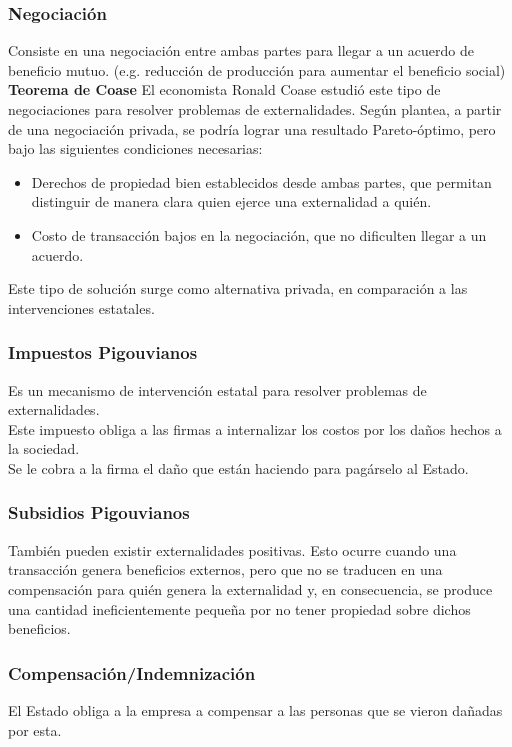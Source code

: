 \subsubsection{Negociación}
Consiste en una negociación entre ambas partes para llegar a un acuerdo de beneficio mutuo. (e.g. reducción de producción para aumentar el beneficio social)\\


\textbf{Teorema de Coase}
El economista Ronald Coase estudió este tipo de negociaciones para resolver problemas de externalidades. Según plantea, a partir de una negociación privada, se podría lograr una resultado Pareto-óptimo, pero bajo las siguientes condiciones necesarias:
\begin{itemize}
    \item Derechos de propiedad bien establecidos desde ambas partes, que permitan distinguir de manera clara quien ejerce una externalidad a quién.
    \item Costo de transacción bajos en la negociación, que no dificulten llegar a un acuerdo.
\end{itemize}

Este tipo de solución surge como alternativa privada, en comparación a las intervenciones estatales.

\subsubsection{Impuestos Pigouvianos}
Es un mecanismo de intervención estatal para resolver problemas de externalidades.\\

Este impuesto obliga a las firmas a internalizar los costos por los daños hechos a la sociedad.\\

Se le cobra a la firma el daño que están haciendo para pagárselo al Estado.

\subsubsection{Subsidios Pigouvianos}
También pueden existir externalidades positivas. Esto ocurre cuando una transacción genera beneficios externos, pero que no se traducen en una compensación para quién genera la externalidad y, en consecuencia, se produce una cantidad ineficientemente pequeña por no tener propiedad sobre dichos beneficios.

\subsubsection{Compensación/Indemnización}
El Estado obliga a la empresa a compensar a las personas que se vieron dañadas por esta.


